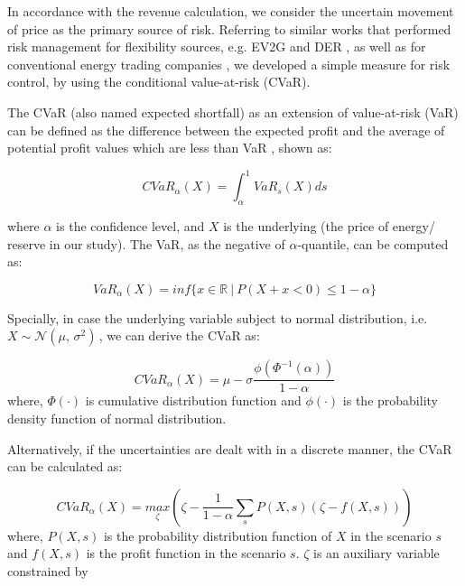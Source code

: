 In accordance with the revenue calculation, we consider the uncertain movement of price as the primary source of risk. Referring to similar works that performed risk management for flexibility sources, e.g. EV2G \cite{Alipour2017} and DER \cite{Han2017}, as well as for conventional energy trading companies \cite{Mohammadi-Ivatloo2013}, we developed a simple measure for risk control, by using the conditional value-at-risk (CVaR).

The CVaR (also named expected shortfall) as an extension of value-at-risk (VaR) can be defined as the difference between the expected profit and the average of potential profit values which are less than VaR \cite{Rockafellar2000}, shown as:

\begin{equation}
\label{eq:CVaR}
CVaR_\alpha (X) = \int_{\alpha}^{1} VaR_s(X) ds
\end{equation}

where $\alpha$ is the confidence level, and $X$ is the underlying (the price of energy/ reserve in our study). The VaR, as the negative of $\alpha$-quantile, can be computed as:

\begin{equation}
\label{VaR}
VaR_\alpha(X) = inf \{x \in \mathbb{R}~|~ P(X+x<0)\leq 1-\alpha\}
\end{equation}

Specially, in case the underlying variable subject to normal distribution, i.e. $X \sim \mathcal{N}(\mu,\,\sigma^{2})\,$, we can derive the CVaR as:

\begin{equation}
CVaR_\alpha(X) = \mu - \sigma \frac{\phi(\Phi^{-1}(\alpha))}{1-\alpha}
\end{equation}
where, $\Phi(\cdot)$ is cumulative distribution function and $\phi(\cdot)$ is the probability density function of normal distribution.

Alternatively, if the uncertainties are dealt with in a discrete manner, the CVaR can be calculated as\cite{Rockafellar2000}:

\begin{equation}
CVaR_\alpha (X) = \underset{\zeta}{max}\left( \zeta - \frac{1}{1-\alpha} \sum_{s} P(X,s) (\zeta - f(X,s))\right)
\end{equation}
where, $P(X,s)$ is the probability distribution function of $X$ in the scenario $s$ and $f(X,s)$ is the profit function in the scenario $s$. $\zeta$ is an auxiliary variable constrained by

